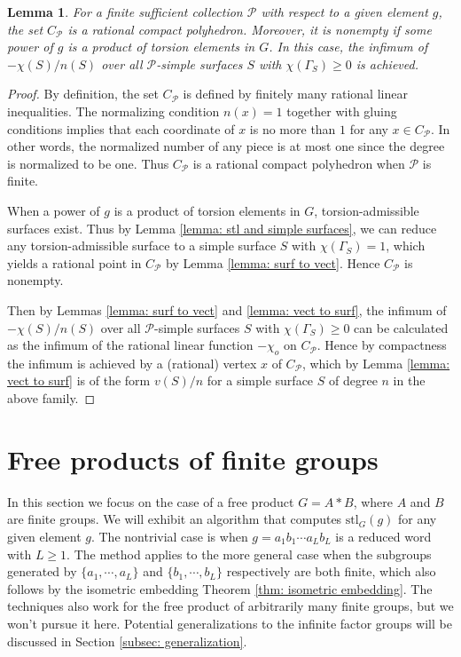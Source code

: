 \documentclass{amsart}
\newtheorem{lemma}[theorem]{Lemma}
\theoremstyle{definition}
\numberwithin{equation}{section}
\theoremstyle{theorem}
\theoremstyle{remark}
\def\stl{\mathrm{stl}}
\begin{document}
	\begin{lemma}\label{lemma: linprog}
		For a finite sufficient collection $\mathcal{P}$ with respect to a given element $g$, the set $C_\mathcal{P}$ is a rational compact polyhedron. Moreover, it is nonempty if some power of $g$ is a product of torsion elements in $G$. In this case, the infimum of $-\chi(S)/n(S)$ over all $\mathcal{P}$-simple surfaces $S$ with $\chi(\Gamma_S)\ge0$ is achieved.
	\end{lemma}
	\begin{proof}
		By definition, the set $C_\mathcal{P}$ is defined by finitely many rational linear inequalities. The normalizing condition $n(x)=1$ together with gluing conditions implies that each coordinate of $x$ is no more than $1$ for any $x\in C_\mathcal{P}$. In other words, the normalized number of any piece is at most one since the degree is normalized to be one. Thus $C_\mathcal{P}$ is a rational compact polyhedron when $\mathcal{P}$ is finite.
		
		When a power of $g$ is a product of torsion elements in $G$, torsion-admissible surfaces exist. Thus by Lemma \ref{lemma: stl and simple surfaces}, we can reduce any torsion-admissible surface to a simple surface $S$ with $\chi(\Gamma_S)=1$, which yields a rational point in $C_\mathcal{P}$ by Lemma \ref{lemma: surf to vect}. Hence $C_\mathcal{P}$ is nonempty.
		
		Then by Lemmas \ref{lemma: surf to vect} and \ref{lemma: vect to surf}, the infimum of $-\chi(S)/n(S)$ over all $\mathcal{P}$-simple surfaces $S$ with $\chi(\Gamma_S)\ge0$ can be calculated as the infimum of the rational linear function $-\chi_o$ on $C_\mathcal{P}$. Hence by compactness the infimum is achieved by a (rational) vertex $x$ of $C_\mathcal{P}$, which by Lemma \ref{lemma: vect to surf} is of the form $v(S)/n$ for a simple surface $S$ of degree $n$ in the above family.
	\end{proof}
	
	
	\section{Free products of finite groups}\label{sec: compute stl}
	In this section we focus on the case of a free product $G=A*B$, where $A$ and $B$ are finite groups.
	We will exhibit an algorithm that computes $\stl_G(g)$ for any given element $g$.
	The nontrivial case is when $g=a_1b_1\cdots a_L b_L$ is a reduced word with $L\ge1$.
	The method applies to the more general case when the subgroups generated by $\{a_1,\cdots, a_L\}$ and $\{b_1,\cdots,b_L\}$ respectively are both finite, which also follows by the isometric embedding Theorem \ref{thm: isometric embedding}. The techniques also work for the free product of arbitrarily many finite groups, but we won't pursue it here. Potential generalizations to the infinite factor groups will be discussed in Section \ref{subsec: generalization}.
	
\end{document}
